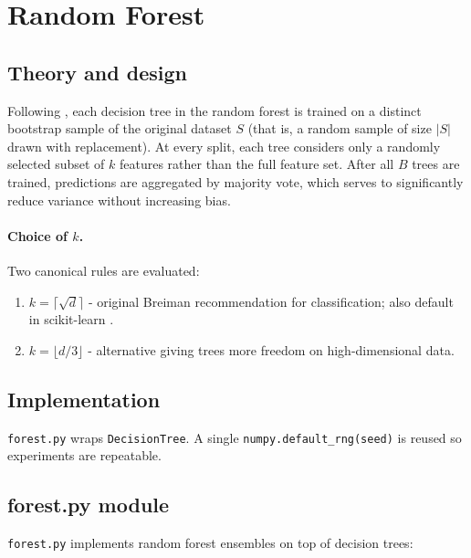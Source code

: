 \documentclass[12pt]{report}
\begin{document}
\section{Random Forest}

\subsection{Theory and design}
Following \citet[p.,256]{shalev}, each decision tree in the random forest is trained on a 
distinct bootstrap sample of the original dataset $S$ (that is, a random sample of size 
$|S|$ drawn with replacement). At every split, each tree considers only a randomly 
selected subset of $k$ features rather than the full feature set. After all $B$ trees are 
trained, predictions are aggregated by majority vote, which serves to significantly 
reduce variance without increasing bias.

\paragraph{Choice of $k$.}
Two canonical rules are evaluated:

\begin{enumerate}
  \item $k=\lceil\sqrt d\rceil$ - original Breiman recommendation for
        classification; also default in scikit-learn
        \citep{pedregosa2011scikit}.

  \item $k=\lfloor d/3\rfloor$ - alternative giving trees more freedom 
        on high-dimensional data.
\end{enumerate}

\subsection{Implementation}
\texttt{forest.py} wraps \texttt{DecisionTree}.  A single
\texttt{numpy.default\_rng(seed)} is reused so experiments are repeatable.

\subsection{forest.py module}
\texttt{forest.py} implements random forest ensembles on top of decision trees:
\end{document}
